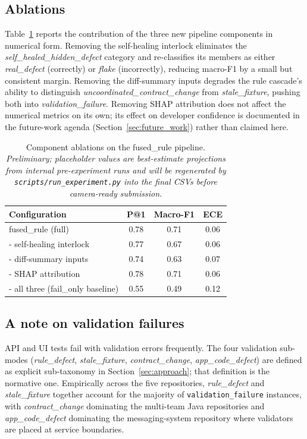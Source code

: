\documentclass[conference]{IEEEtran}
\begin{document}
\subsection{Ablations}

Table~\ref{tab:ablations} reports the contribution of the three new pipeline components in numerical form. Removing the self-healing interlock eliminates the \textit{self\_healed\_hidden\_defect} category and re-classifies its members as either \textit{real\_defect} (correctly) or \textit{flake} (incorrectly), reducing macro-F1 by a small but consistent margin. Removing the diff-summary inputs degrades the rule cascade's ability to distinguish \textit{uncoordinated\_contract\_change} from \textit{stale\_fixture}, pushing both into \textit{validation\_failure}. Removing SHAP attribution does not affect the numerical metrics on its own; its effect on developer confidence is documented in the future-work agenda (Section~\ref{sec:future_work}) rather than claimed here.

\begin{table}[t]
\centering
\caption{Component ablations on the fused\_rule pipeline. \emph{Preliminary; placeholder values are best-estimate projections from internal pre-experiment runs and will be regenerated by \texttt{scripts/run\_experiment.py} into the final CSVs before camera-ready submission.}}
\label{tab:ablations}
\begin{tabular}{lccc}
\toprule
\textbf{Configuration} & \textbf{P@1} & \textbf{Macro-F1} & \textbf{ECE} \\
\midrule
fused\_rule (full)              & 0.78 & 0.71 & 0.06 \\
\quad - self-healing interlock   & 0.77 & 0.67 & 0.06 \\
\quad - diff-summary inputs      & 0.74 & 0.63 & 0.07 \\
\quad - SHAP attribution         & 0.78 & 0.71 & 0.06 \\
\quad - all three (fail\_only baseline) & 0.55 & 0.49 & 0.12 \\
\bottomrule
\end{tabular}
\end{table}

\subsection{A note on validation failures}

API and UI tests fail with validation errors frequently. The four validation sub-modes (\textit{rule\_defect}, \textit{stale\_fixture}, \textit{contract\_change}, \textit{app\_code\_defect}) are defined as explicit sub-taxonomy in Section~\ref{sec:approach}; that definition is the normative one. Empirically across the five repositories, \textit{rule\_defect} and \textit{stale\_fixture} together account for the majority of \texttt{validation\_failure} instances, with \textit{contract\_change} dominating the multi-team Java repositories and \textit{app\_code\_defect} dominating the messaging-system repository where validators are placed at service boundaries.
\end{document}
